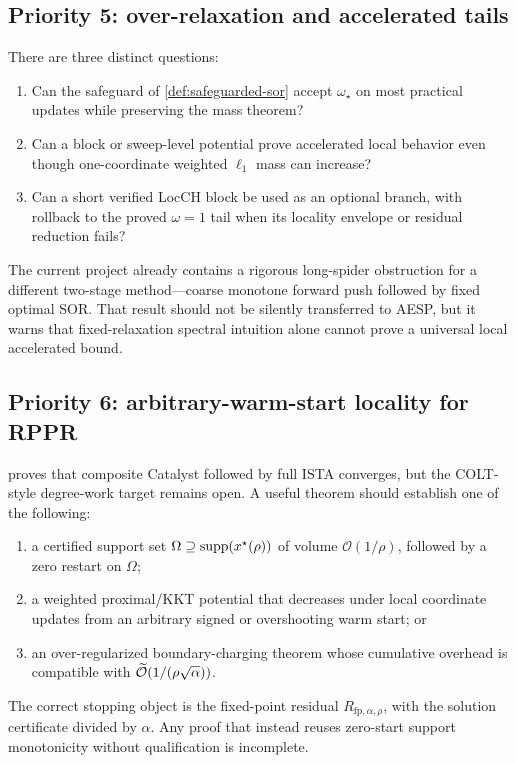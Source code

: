 \subsection{Priority 5: over-relaxation and accelerated tails}

There are three distinct questions:
\begin{enumerate}[leftmargin=2em]
\item Can the safeguard of \cref{def:safeguarded-sor} accept
      \(\omega_\star\) on most practical updates while preserving the mass
      theorem?
\item Can a block or sweep-level potential prove accelerated local behavior
      even though one-coordinate weighted \(\ell_1\) mass can increase?
\item Can a short verified LocCH block be used as an optional branch, with
      rollback to the proved \(\omega=1\) tail when its locality envelope or
      residual reduction fails?
\end{enumerate}
The current project already contains a rigorous long-spider obstruction for a
different two-stage method---coarse monotone forward push followed by fixed
optimal SOR.  That result should not be silently transferred to AESP, but it
warns that fixed-relaxation spectral intuition alone cannot prove a universal
local accelerated bound.

\subsection{Priority 6: arbitrary-warm-start locality for RPPR}

 proves that composite Catalyst followed by
full ISTA converges, but the COLT-style degree-work target remains open.  A
useful theorem should establish one of the following:
\begin{enumerate}[leftmargin=2em]
\item a certified support set \(\Omega\supseteq\operatorname{supp}(x^\star(\rho))\) of volume
      \(\mathcal O(1/\rho)\), followed by a zero restart on \(\Omega\);
\item a weighted proximal/KKT potential that decreases under local coordinate
      updates from an arbitrary signed or overshooting warm start; or
\item an over-regularized boundary-charging theorem whose cumulative overhead
      is compatible with \(\widetilde{\mathcal O}(1/(\rho\sqrt\alpha))\).
\end{enumerate}
The correct stopping object is the fixed-point residual \(R_{\mathrm{fp},\alpha,\rho}\), with the
solution certificate divided by \(\alpha\).  Any proof that instead reuses
zero-start support monotonicity without qualification is incomplete.

